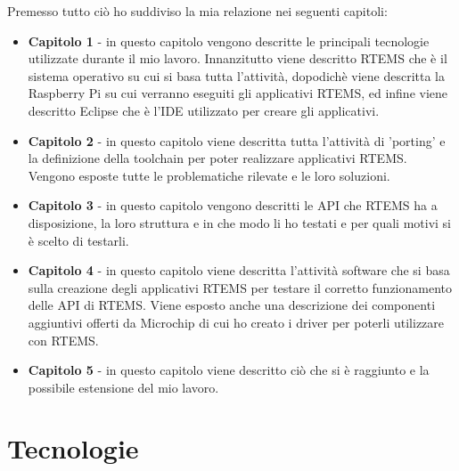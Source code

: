 \documentclass[12pt, a4paper, titlepage, oneside]{book}
\begin{document}
\begin{flushleft}
Premesso tutto ciò ho suddiviso la mia relazione nei seguenti capitoli:

\begin{itemize}
    \item \textbf{Capitolo 1} - in questo capitolo vengono descritte le principali tecnologie utilizzate durante il mio lavoro. Innanzitutto viene descritto RTEMS che è il sistema operativo su cui si basa tutta l'attività, dopodichè viene  descritta la Raspberry Pi su cui verranno eseguiti gli applicativi RTEMS, ed infine viene descritto Eclipse che è l'IDE utilizzato per creare gli applicativi.
    \item \textbf{Capitolo 2} - in questo capitolo viene descritta tutta l'attività di 'porting' e la definizione della toolchain per poter realizzare applicativi RTEMS. Vengono esposte tutte le problematiche rilevate e le loro soluzioni. 
    \item \textbf{Capitolo 3} - in questo capitolo vengono descritti le API che RTEMS ha a disposizione, la loro struttura e in che modo li ho testati e per quali motivi si è scelto di testarli.
    \item \textbf{Capitolo 4} - in questo capitolo viene descritta l'attività software che si basa sulla creazione degli applicativi RTEMS per testare il corretto funzionamento delle API di RTEMS. Viene esposto anche una descrizione dei componenti aggiuntivi offerti da Microchip di cui ho creato i driver per poterli utilizzare con RTEMS.
    \item \textbf{Capitolo 5} - in questo capitolo viene descritto ciò che si è raggiunto e la possibile estensione del mio lavoro.
\end{itemize} 
\chapter{Tecnologie}


\end{flushleft}
\end{document}
